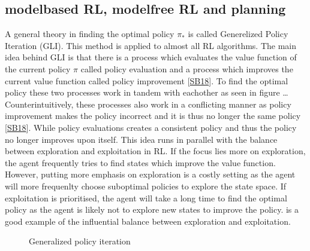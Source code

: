 \documentclass[letterpaper,10pt,english]{jupyterBook}
\let\sphinxpxdimen\pdfpxdimen\else\newdimen\sphinxpxdimen
\begin{document}
\subsection{model\sphinxhyphen{}based RL, model\sphinxhyphen{}free RL and planning}
\label{\detokenize{Reinforcement_learning:model-based-rl-model-free-rl-and-planning}}
\sphinxAtStartPar
A general theory in finding the optimal policy \(\pi_*\) is called Generelized Policy Iteration (GLI). This method is applied to almost all RL algorithms. The main idea behind GLI is that there is a process which evaluates the value function of the current policy \(\pi\) called policy evaluation and a process which improves the current value function called policy improvement {[}\hyperlink{cite.Financial_application:id70}{SB18}{]}. To find the optimal policy these two processes work in tandem with eachother as seen in figure … Counterintuitively, these processes also work in a conflicting manner as policy improvement makes the policy incorrect and it is thus no longer the same policy {[}\hyperlink{cite.Financial_application:id70}{SB18}{]}. While policy evaluations creates a consistent policy and thus the policy no longer improves upon itself. This idea runs in parallel with the balance between exploration and exploitation in RL.  If the focus lies more on exploration, the agent frequently tries to find states which improve the value function. However, putting more emphasis on exploration is a costly setting as the agent will more frequenlty choose suboptimal policies to explore the state space. If exploitation is prioritised, the agent will take a long time to find the optimal policy as the agent is likely not to explore new states to improve the policy.  is a good example of the influential balance between exploration and exploitation.

\begin{figure}[htbp]
\centering
\capstart

\noindent\sphinxincludegraphics[width=500\sphinxpxdimen,height=300\sphinxpxdimen]{{GPI}.png}
\caption{Generalized policy iteration}\label{\detokenize{Reinforcement_learning:gpi-fig}}\end{figure}
\end{document}
